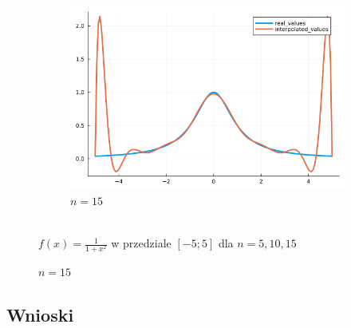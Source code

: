 \documentclass{article}
\def\v{0.47}
\begin{document}
\begin{figure}[H]
\begin{subfigure}[b]{\v\linewidth}
			\includegraphics[width=\linewidth]{graphs/zad6.b.15.png}
			\caption{$n = 15$}
		\end{subfigure}
	\\{$f(x) = \frac{1}{1+x^2}$ w przedziale $[-5;5]$ dla $n = 5,10,15$}
	\end{figure}
\subsection*{Wnioski}
\end{document}
